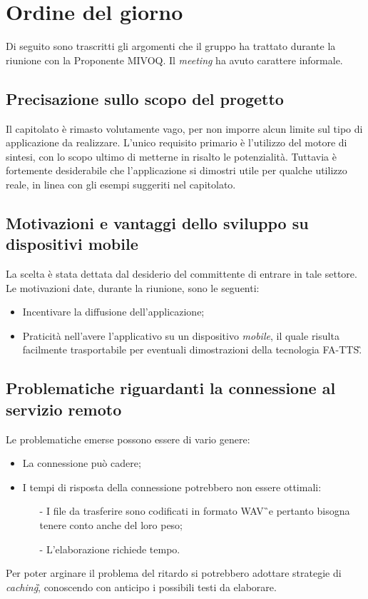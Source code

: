 \section{Ordine del giorno}
Di seguito sono trascritti gli argomenti che il gruppo ha trattato durante la riunione con la
Proponente MIVOQ. Il \textit{meeting} ha avuto carattere informale.

\subsection{Precisazione sullo scopo del progetto}
Il capitolato è rimasto volutamente vago, per non imporre alcun limite sul tipo di applicazione da realizzare. L’unico requisito primario è l'utilizzo del motore di sintesi, con lo scopo ultimo di metterne in risalto le potenzialità. Tuttavia è fortemente desiderabile che l’applicazione si dimostri utile per qualche utilizzo reale, in linea con gli esempi suggeriti nel capitolato.

\subsection{Motivazioni e vantaggi dello sviluppo su dispositivi mobile}
La scelta è stata dettata dal desiderio del committente di entrare in tale settore. Le motivazioni date, durante la riunione, sono le seguenti:
\begin{itemize}
	\item Incentivare la diffusione dell'applicazione;
	\item Praticità nell'avere l'applicativo su un dispositivo \textit{mobile}, il quale risulta facilmente trasportabile per eventuali dimostrazioni della tecnologia FA-TTS\G.
\end{itemize}

\subsection{Problematiche riguardanti la connessione al servizio remoto}
Le problematiche emerse possono essere di vario genere:
\begin{itemize}
\item La connessione può cadere;
\item I tempi di risposta della connessione potrebbero non essere ottimali:
\begin{itemize}
\item[-]I file da trasferire sono codificati in formato WAV\G\ e pertanto 
bisogna tenere conto anche del loro peso;
\item[-]L'elaborazione richiede tempo.
\end{itemize}
\end{itemize}
Per poter arginare il problema del ritardo si potrebbero adottare strategie di 
\textit{caching}\G , conoscendo con anticipo i possibili testi da elaborare.


